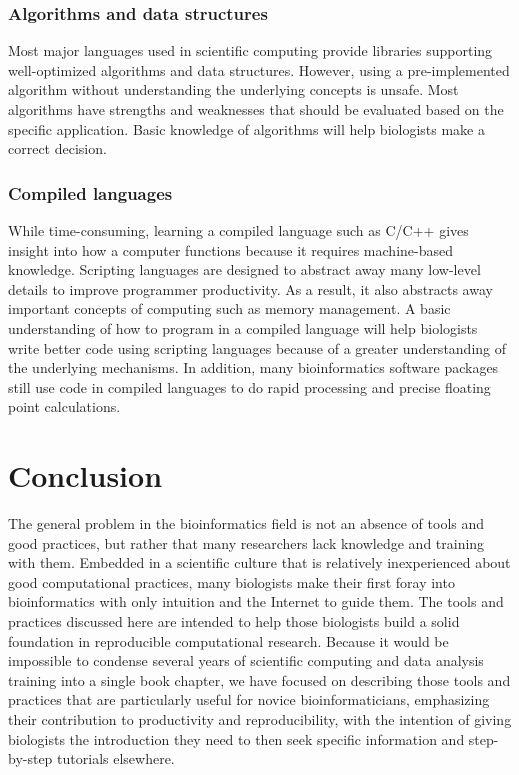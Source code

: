 \documentclass[ChapterTOCs,krantz2]{krantz} %
\begin{document}
\subsubsection{Algorithms and data structures}

Most major languages used in
scientific computing provide libraries supporting well-optimized algorithms and
data structures. However, using a
pre-implemented algorithm without understanding the underlying concepts is
unsafe. Most algorithms have strengths and weaknesses that should be 
evaluated based on the specific application. Basic knowledge of algorithms 
will help biologists make a correct decision.

\subsubsection{Compiled languages}

While time-consuming, learning a compiled language such as C/C++
gives insight into how a computer functions because it requires 
machine-based knowledge. Scripting languages are designed to abstract 
away many low-level
details to improve programmer productivity. As a result, it also abstracts away
important concepts of computing such as memory management. A basic
understanding of how to program in a compiled language will help biologists
write better code using scripting languages because of a greater understanding
of the underlying mechanisms. In addition, many bioinformatics software
packages still use code in compiled languages to do rapid
processing and precise floating point calculations.  

\section{Conclusion}\label{conclusion}

The general problem in the
bioinformatics field is not an absence of tools and good practices, but rather
that many researchers lack knowledge and training with them\cite{Merali2010}.  Embedded in a scientific
culture that is relatively inexperienced about good computational practices, 
many biologists make their
first foray into bioinformatics with only intuition and the Internet to guide
them.  The tools and practices discussed here are intended to help
those biologists build a solid foundation in reproducible computational
research.  Because it would be impossible to condense several years of
scientific computing and data analysis training into a single book chapter, we
have focused on describing those tools and practices that are particularly
useful for novice bioinformaticians, emphasizing their contribution to 
productivity and reproducibility, with the intention of giving biologists the
introduction they need to then seek specific information and step-by-step
tutorials elsewhere. 
\end{document}
